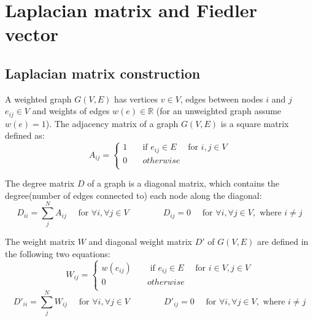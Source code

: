 \documentclass[a4paper, 11pt]{article}
\begin{document}


\section{Laplacian matrix and Fiedler vector}
\subsection{Laplacian matrix construction} \label{sec:laplacian}
A weighted graph $G(V,E)$ has vertices $v \in V$, edges between nodes $i$ and $j$ $e_{ij} \in V$ and weights of edges $w(e) \in \mathbb{R}$ (for an unweighted graph assume $w(e)=1$). The adjacency matrix of a graph $G(V,E)$ is a square matrix defined as:
\begin{equation}
  A_{ij} =
  \begin{cases}
    1 & \quad  \text{if } e_{ij} \in E \quad \text{ for } i, j \in V\\
    0  & \quad otherwise\\
  \end{cases}
\end{equation}

The degree matrix $D$ of a graph  is a diagonal matrix, which contains the degree(number of edges connected to) each node along the diagonal:
\begin{equation}
D_{ii} =
    \sum_j^N{A_{ij}} \quad \text{ for } \forall i, \forall j \in V
    \qquad \qquad
    D_{ij} = 0 \quad \text{ for } \forall i, \forall j \in V, \text{ where } i \neq j
\end{equation}

The weight matrix $W$ and diagonal weight matrix $D'$ of $G(V,E)$ are defined in the following two equations:
\begin{equation} \label{eq:weightmatrix}
  W_{ij} =
  \begin{cases}
    w(e_{ij}) & \quad \text{ if } e_{ij} \in E  \quad \text{ for } i \in V, j \in V\\
    0  & \quad otherwise\\
  \end{cases}
\end{equation} 
\begin{equation} \label{eq:diagweightmatrix}
D'_{ii} =
    \sum_j^N{W_{ij}} \quad \text{ for } \forall i, \forall j \in V
    \qquad \qquad
    D'_{ij} = 0 \quad \text{ for } \forall i, \forall j \in V, \text{ where } i \neq j
\end{equation}
\end{document}
